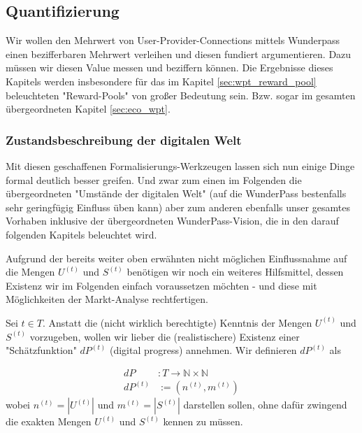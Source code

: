 
\subsection{Quantifizierung}
\label{sec:eco_zahlen}

Wir wollen den Mehrwert von User-Provider-Connections mittels Wunderpass einen bezifferbaren Mehrwert verleihen und diesen fundiert argumentieren. Dazu müssen wir diesen Value messen und beziffern können. Die Ergebnisse dieses Kapitels werden insbesondere für das im Kapitel \ref{sec:wpt_reward_pool} beleuchteten "Reward-Pools" von großer Bedeutung sein. Bzw. sogar im gesamten übergeordneten Kapitel \ref{sec:eco_wpt}.


\subsubsection{Zustandsbeschreibung der digitalen Welt}
\label{sec:eco_zahlen_zustand_digitalisierung}

Mit diesen geschaffenen Formalisierungs-Werkzeugen lassen sich nun einige Dinge formal deutlich besser greifen. Und zwar zum einen im Folgenden die übergeordneten "Umstände der digitalen Welt" (auf die WunderPass bestenfalls sehr geringfügig Einfluss üben kann) aber zum anderen ebenfalls unser gesamtes Vorhaben inklusive der übergeordneten WunderPass-Vision, die in den darauf folgenden Kapitels beleuchtet wird. 

\vspace{0.3cm}

Aufgrund der bereits weiter oben erwähnten nicht möglichen Einflussnahme auf die Mengen $U^{(t)}$ und $S^{(t)}$ benötigen wir noch ein weiteres Hilfsmittel, dessen Existenz wir im Folgenden einfach voraussetzen möchten - und diese mit Möglichkeiten der Markt-Analyse rechtfertigen.

\vspace{0.3cm}

\begin{Assumption}\label{assumptionOrakel}

Sei $t \in T$. Anstatt die (nicht wirklich berechtigte) Kenntnis der Mengen $U^{(t)}$ und $S^{(t)}$ vorzugeben, wollen wir lieber die (realistischere) Existenz einer "Schätzfunktion" $dP^{(t)}$ (digital progress) annehmen. Wir definieren $dP^{(t)}$ als

\begin{align*}
dP &: T \rightarrow \mathbb{N} \times \mathbb{N}  \\
dP^{(t)} &:= \left(n^{(t)}, m^{(t)}\right)
\end{align*}
wobei $n^{(t)} = |U^{(t)}|$ und $m^{(t)} = |S^{(t)}|$ darstellen sollen, ohne dafür zwingend die exakten Mengen $U^{(t)}$ und $S^{(t)}$ kennen zu müssen.

\end{Assumption}

